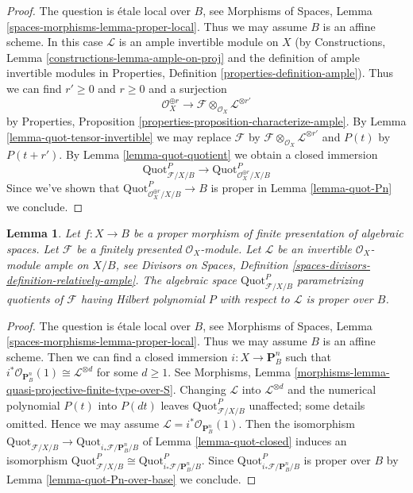 \documentclass{stacks-project}
\theoremstyle{plain}
\newtheorem{lemma}[subsection]{Lemma}
\theoremstyle{definition}
\theoremstyle{remark}
\numberwithin{equation}{subsection}
\def\Quotfunctor{\mathrm{Quot}}
\begin{document}
\begin{proof}
The question is \'etale local over $B$, see
Morphisms of Spaces, Lemma \ref{spaces-morphisms-lemma-proper-local}.
Thus we may assume $B$ is an affine scheme.
In this case $\mathcal{L}$ is an ample invertible module on $X$
(by Constructions, Lemma \ref{constructions-lemma-ample-on-proj}
and the definition of ample invertible modules in
Properties, Definition \ref{properties-definition-ample}).
Thus we can find $r' \geq 0$ and $r \geq 0$ and a surjection
$$
\mathcal{O}_X^{\oplus r} \longrightarrow
\mathcal{F} \otimes_{\mathcal{O}_X} \mathcal{L}^{\otimes r'}
$$
by Properties, Proposition \ref{properties-proposition-characterize-ample}.
By Lemma \ref{lemma-quot-tensor-invertible}
we may replace $\mathcal{F}$ by
$\mathcal{F} \otimes_{\mathcal{O}_X} \mathcal{L}^{\otimes r'}$
and $P(t)$ by $P(t + r')$.
By Lemma \ref{lemma-quot-quotient}
we obtain a closed immersion
$$
\Quotfunctor^P_{\mathcal{F}/X/B}
\longrightarrow
\Quotfunctor^P_{\mathcal{O}_X^{\oplus r}/X/B}
$$
Since we've shown that $\Quotfunctor^P_{\mathcal{O}_X^{\oplus r}/X/B} \to B$
is proper in Lemma \ref{lemma-quot-Pn} we conclude.
\end{proof}

\begin{lemma}
\label{lemma-quot-proper-over-base}
Let $f : X \to B$ be a proper morphism of finite presentation
of algebraic spaces. Let $\mathcal{F}$ be a finitely presented
$\mathcal{O}_X$-module. Let $\mathcal{L}$ be an invertible
$\mathcal{O}_X$-module ample on $X/B$, see
Divisors on Spaces, Definition
\ref{spaces-divisors-definition-relatively-ample}.
The algebraic space $\Quotfunctor^P_{\mathcal{F}/X/B}$
parametrizing quotients of $\mathcal{F}$
having Hilbert polynomial $P$ with respect to $\mathcal{L}$
is proper over $B$.
\end{lemma}

\begin{proof}
The question is \'etale local over $B$, see
Morphisms of Spaces, Lemma \ref{spaces-morphisms-lemma-proper-local}.
Thus we may assume $B$ is an affine scheme.
Then we can find a closed immersion $i : X \to \mathbf{P}^n_B$
such that $i^*\mathcal{O}_{\mathbf{P}^n_B}(1) \cong \mathcal{L}^{\otimes d}$
for some $d \geq 1$. See
Morphisms, Lemma \ref{morphisms-lemma-quasi-projective-finite-type-over-S}.
Changing $\mathcal{L}$ into $\mathcal{L}^{\otimes d}$ and
the numerical polynomial $P(t)$ into $P(dt)$ leaves
$\Quotfunctor^P_{\mathcal{F}/X/B}$ unaffected; some details omitted.
Hence we may assume $\mathcal{L} = i^*\mathcal{O}_{\mathbf{P}^n_B}(1)$.
Then the isomorphism
$\Quotfunctor_{\mathcal{F}/X/B} \to
\Quotfunctor_{i_*\mathcal{F}/\mathbf{P}^n_B/B}$ of
Lemma \ref{lemma-quot-closed} induces an isomorphism
$\Quotfunctor^P_{\mathcal{F}/X/B} \cong
\Quotfunctor^P_{i_*\mathcal{F}/\mathbf{P}^n_B/B}$.
Since $\Quotfunctor^P_{i_*\mathcal{F}/\mathbf{P}^n_B/B}$
is proper over $B$ by Lemma \ref{lemma-quot-Pn-over-base}
we conclude.
\end{proof}
\end{document}
